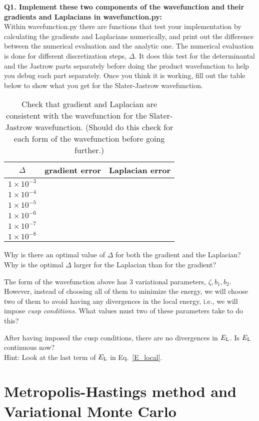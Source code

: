\documentclass[11pt,aps,prb,amsmath,amssymb,superscriptaddress,notitlepage]{revtex4-1}
\def\EL{E_{\rm L}}
\providecommand{\tabularnewline}{\\}
\begin{document}
{\color{blue}
\textbf{Q1. Implement these two components of the wavefunction and their gradients and Laplacians in wavefunction.py:}\\
Within wavefunction.py there are functions that test your implementation by calculating the gradients
and Laplacians numerically, and print out the difference between the numerical evaluation and the analytic one.
The numerical evaluation is done for different discretization steps, $\Delta$.
It does this test for the determinantal and the Jastrow parts separately before doing the product wavefunction
to help you debug each part separately.
Once you think it is working, fill out the table below to show what you get for the Slater-Jastrow wavefunction.

\begin{table}[H]
\begin{center}
\color{blue}
\caption{Check that gradient and Laplacian are consistent with the wavefunction for the Slater-Jastrow wavefunction.
(Should do this check for each form of the wavefunction before going further.)}
\label{gradient_laplacian}
\begin{tabular}{|c|c|c|}
\hline
$\Delta$ & gradient error & Laplacian error \\
\hline
$1 \times 10^{-3}$ &  & \tabularnewline
\hline
$1 \times 10^{-4}$ &  & \tabularnewline
\hline
$1 \times 10^{-5}$ &  & \tabularnewline
\hline
$1 \times 10^{-6}$ &  & \tabularnewline
\hline
$1 \times 10^{-7}$ &  & \tabularnewline
\hline
$1 \times 10^{-8}$ &  & \tabularnewline
\hline
\end{tabular}
\end{center}
\end{table}

Why is there an optimal value of $\Delta$ for both the gradient and the Laplacian?
Why is the optimal $\Delta$ larger for the Laplacian than for the gradient?

The form of the wavefunction above has 3 variational parameters, $\zeta, b_1, b_2$.
However, instead of choosing all of them to minimize the energy, we will choose two of them
to avoid having any divergences in the local energy, i.e., we will impose {\it cusp conditions}.
What values must two of these parameters take to do this?

After having imposed the cusp conditions, there are no divergences in $\EL$.
Is $\EL$ continuous now? \\
Hint: Look at the last term of $\EL$ in Eq.~\ref{E_local}.
}

\section{Metropolis-Hastings method and Variational Monte Carlo}
\end{document}
